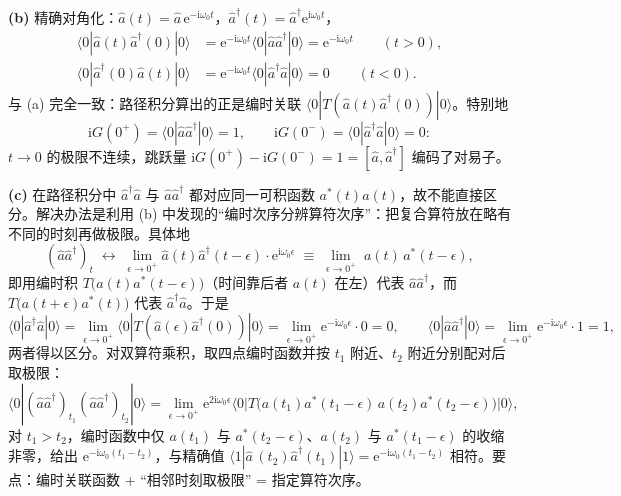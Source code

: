\textbf{(b)} 精确对角化：$\hat a(t)=\hat a\,\mathrm{e}^{-\mathrm{i}\omega_0t}$，$\hat a^\dagger(t)=\hat a^\dagger\mathrm{e}^{\mathrm{i}\omega_0t}$，
\begin{align*}
\langle0|\hat a(t)\hat a^\dagger(0)|0\rangle&=\mathrm{e}^{-\mathrm{i}\omega_0t}\langle0|\hat a\hat a^\dagger|0\rangle=\mathrm{e}^{-\mathrm{i}\omega_0t}\qquad(t>0),\\
\langle0|\hat a^\dagger(0)\hat a(t)|0\rangle&=\mathrm{e}^{-\mathrm{i}\omega_0t}\langle0|\hat a^\dagger\hat a|0\rangle=0\qquad(t<0).
\end{align*}
与 (a) 完全一致：路径积分算出的正是编时关联 $\langle0|T(\hat a(t)\hat a^\dagger(0))|0\rangle$。特别地
\begin{equation*}
\mathrm{i}G(0^+)=\langle0|\hat a\hat a^\dagger|0\rangle=1,\qquad
\mathrm{i}G(0^-)=\langle0|\hat a^\dagger\hat a|0\rangle=0:
\end{equation*}
$t\to0$ 的极限不连续，跳跃量 $\mathrm{i}G(0^+)-\mathrm{i}G(0^-)=1=[\hat a,\hat a^\dagger]$ 编码了对易子。

\textbf{(c)} 在路径积分中 $\hat a^\dagger\hat a$ 与 $\hat a\hat a^\dagger$ 都对应同一可积函数 $a^*(t)a(t)$，故不能直接区分。解决办法是利用 (b) 中发现的“编时次序分辨算符次序”：把复合算符放在略有不同的时刻再做极限。具体地
\begin{equation*}
(\hat a\hat a^\dagger)_t\;\longleftrightarrow\;\lim_{\epsilon\to0^+}\hat a(t)\hat a^\dagger(t-\epsilon)\cdot\mathrm{e}^{\mathrm{i}\omega_0\epsilon}
\;\equiv\;\lim_{\epsilon\to0^+}\;a(t)\,a^*(t-\epsilon),
\end{equation*}
即用编时积 $T\big(a(t)a^*(t-\epsilon)\big)$（时间靠后者 $a(t)$ 在左）代表 $\hat a\hat a^\dagger$，而 $T\big(a(t+\epsilon)a^*(t)\big)$ 代表 $\hat a^\dagger\hat a$。于是
\begin{equation*}
\langle0|\hat a^\dagger\hat a|0\rangle=\lim_{\epsilon\to0^+}\langle0|T(\hat a(\epsilon)\hat a^\dagger(0))|0\rangle=\lim_{\epsilon\to0^+}\mathrm{e}^{-\mathrm{i}\omega_0\epsilon}\cdot0=0,
\qquad
\langle0|\hat a\hat a^\dagger|0\rangle=\lim_{\epsilon\to0^+}\mathrm{e}^{-\mathrm{i}\omega_0\epsilon}\cdot1=1,
\end{equation*}
两者得以区分。对双算符乘积，取四点编时函数并按 $t_1$ 附近、$t_2$ 附近分别配对后取极限：
\begin{equation*}
\langle0|(\hat a\hat a^\dagger)_{t_1}(\hat a\hat a^\dagger)_{t_2}|0\rangle
=\lim_{\epsilon\to0^+}\mathrm{e}^{2\mathrm{i}\omega_0\epsilon}
\big\langle0\big|T\big(a(t_1)a^*(t_1{-}\epsilon)\,a(t_2)a^*(t_2{-}\epsilon)\big)\big|0\big\rangle,
\end{equation*}
对 $t_1>t_2$，编时函数中仅 $a(t_1)$ 与 $a^*(t_2-\epsilon)$、$a(t_2)$ 与 $a^*(t_1-\epsilon)$ 的收缩非零，给出 $\mathrm{e}^{-\mathrm{i}\omega_0(t_1-t_2)}$，与精确值 $\langle1|\hat a^{\,}(t_2)\hat a^\dagger(t_1)|1\rangle=\mathrm{e}^{-\mathrm{i}\omega_0(t_1-t_2)}$ 相符。要点：编时关联函数 + “相邻时刻取极限” = 指定算符次序。

